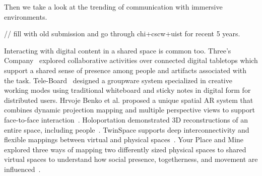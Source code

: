 \documentclass{sigchi}
\begin{document}
Then we take a look at the trending of communication with immersive environments.

// fill with old submission and go through chi+cscw+uist for recent 5 years.

Interacting with digital content in a shared space is common too. Three's Company~\cite{tang2010three} explored collaborative activities over connected digital tabletops which support a shared sense of presence among people and artifacts associated with the task. 
Tele-Board~\cite{gumienny2011tele} designed a groupware system specialized in creative working modes using traditional whiteboard and sticky notes in digital form for distributed users.
Hrvoje Benko et al. proposed a unique spatial AR system that combines dynamic projection mapping and multiple perspective views to support face-to-face interaction~\cite{benko2014dyadic}. 
Holoportation demonstrated 3D reconstructions of an entire space, including people~\cite{orts2016holoportation}.
TwinSpace supports deep interconnectivity and flexible mappings between virtual and physical spaces~\cite{reilly2010twinspace}.
Your Place and Mine explored three ways of mapping two differently sized
physical spaces to shared virtual spaces to understand how social presence, togetherness, and movement are influenced~\cite{sra2018}.

\end{document}
